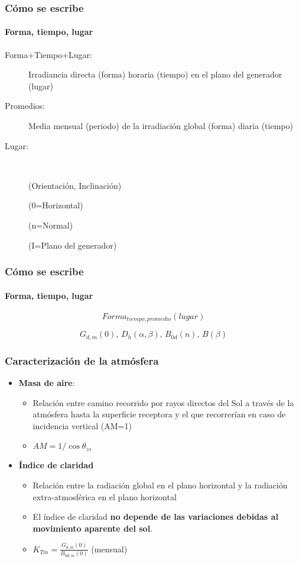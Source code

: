 \documentclass[serif, xcolor=dvipsnames]{beamer}
\begin{document}
\begin{frame}
\frametitle{Cómo se escribe}


\framesubtitle{Forma, tiempo, lugar}
\begin{description}
\item [{Forma+Tiempo+Lugar:}] Irradiancia directa (forma) horaria (tiempo)
en el plano del generador (lugar)
\item [{Promedios:}] Media mensual (periodo) de la irradiación global (forma)
diaria (tiempo) 
\item [{Lugar:}]~


(Orientación, Inclinación) 

(0=Horizontal)

(n=Normal)

(I=Plano del generador)

\end{description}

\end{frame}
\begin{frame}
\frametitle{Cómo se escribe}


\framesubtitle{Forma, tiempo, lugar}

\[
Forma_{tiempo,promedio}(lugar)\]


\[
G_{d,m}(0),\, D_{h}(\alpha,\beta),\, B_{0d}(n),\, B(\beta)\]



\end{frame}
\begin{frame}
\frametitle{Caracterización de la atmósfera}
\begin{itemize}
\item \textbf{Masa de aire}: 

\begin{itemize}
\item Relación entre camino recorrido por rayos directos del Sol a través
de la atmósfera hasta la superficie receptora y el que recorrerían
en caso de incidencia vertical (AM=1)
\item $AM=1/\cos\theta_{zs}$
\end{itemize}
\item \textbf{Índice de claridad}

\begin{itemize}
\item Relación entre la radiación global en el plano horizontal y la radiación
extra-atmosférica en el plano horizontal
\item El índice de claridad \textbf{no depende de las variaciones debidas
al movimiento aparente del sol}.
\item $K_{Tm}=\frac{G_{d,m}(0)}{B_{0d,m}(0)}$ (mensual)
\end{itemize}
\end{itemize}

\end{frame}
\end{document}
